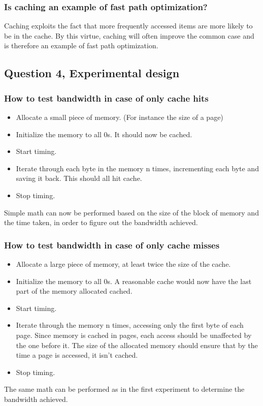 \documentclass[11pt,a4paper]{article}
\begin{document}
\subsubsection{Is caching an example of fast path optimization?}

Caching exploits the fact that more frequently accessed items are more likely
to be in the cache. By this virtue, caching will often improve the common case
and is therefore an example of fast path optimization.

\subsection{Question 4, Experimental design}
\subsubsection{How to test bandwidth in case of only cache hits}
\begin{itemize}
    \item Allocate a small piece of memory. (For instance the size of a page)
    \item Initialize the memory to all 0s. It should now be cached.
    \item Start timing.
    \item Iterate through each byte in the memory n times, incrementing each byte
          and saving it back. This should all hit cache.
    \item Stop timing.
\end{itemize}

Simple math can now be performed based on the size of the block of memory and
the time taken, in order to figure out the bandwidth achieved.

\subsubsection{How to test bandwidth in case of only cache misses}
\begin{itemize}
    \item Allocate a large piece of memory, at least twice the size of the cache.
    \item Initialize the memory to all 0s. A reasonable cache would now have the last part of the memory allocated cached. 
    \item Start timing.
    \item Iterate through the memory n times, accessing only the first byte
          of each page. Since memory is cached in pages, each access should be
          unaffected by the one before it. The size of the allocated memory should
          ensure that by the time a page is accessed, it isn't cached.
    \item Stop timing.
\end{itemize}

The same math can be performed as in the first experiment to determine the
bandwidth achieved.
\end{document}
